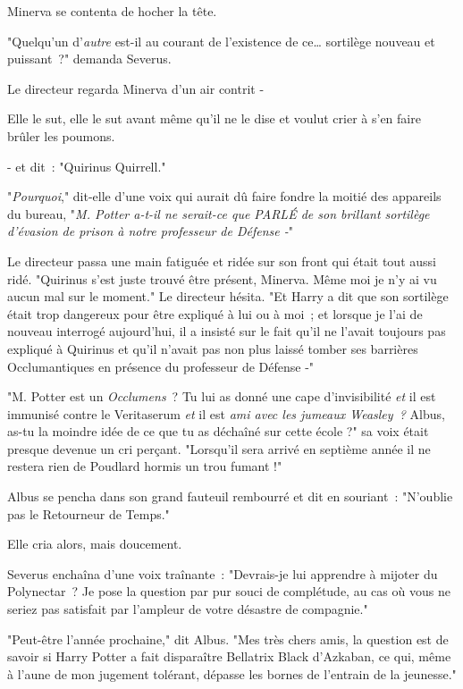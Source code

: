 Minerva se contenta de hocher la tête.

"Quelqu'un d'\emph{autre} est-il au courant de l'existence de ce… sortilège nouveau et puissant~?" demanda Severus.

Le directeur regarda Minerva d'un air contrit -

Elle le sut, elle le sut avant même qu'il ne le dise et voulut crier à s'en faire brûler les poumons.

- et dit~: "Quirinus Quirrell."

"\emph{Pourquoi}," dit-elle d'une voix qui aurait dû faire fondre la moitié des appareils du bureau, "\emph{M. Potter a-t-il ne serait-ce que PARLÉ de son brillant sortilège d'évasion de prison à notre professeur de Défense -}"

Le directeur passa une main fatiguée et ridée sur son front qui était tout aussi ridé. "Quirinus s'est juste trouvé être présent, Minerva. Même moi je n'y ai vu aucun mal sur le moment." Le directeur hésita. "Et Harry a dit que son sortilège était trop dangereux pour être expliqué à lui ou à moi~; et lorsque je l'ai de nouveau interrogé aujourd'hui, il a insisté sur le fait qu'il ne l'avait toujours pas expliqué à Quirinus et qu'il n'avait pas non plus laissé tomber ses barrières Occlumantiques en présence du professeur de Défense -"

"M. Potter est un \emph{Occlumens}~? Tu lui as donné une cape d'invisibilité \emph{et} il est immunisé contre le Veritaserum \emph{et} il est \emph{ami avec les jumeaux Weasley~?} Albus, as-tu la moindre idée de ce que tu as déchaîné sur cette école ?" sa voix était presque devenue un cri perçant. "Lorsqu'il sera arrivé en septième année il ne restera rien de Poudlard hormis un trou fumant !"

Albus se pencha dans son grand fauteuil rembourré et dit en souriant~: "N'oublie pas le Retourneur de Temps."

Elle cria alors, mais doucement.

Severus enchaîna d'une voix traînante~: "Devrais-je lui apprendre à mijoter du Polynectar~? Je pose la question par pur souci de complétude, au cas où vous ne seriez pas satisfait par l'ampleur de votre désastre de compagnie."

"Peut-être l'année prochaine," dit Albus. "Mes très chers amis, la question est de savoir si Harry Potter a fait disparaître Bellatrix Black d'Azkaban, ce qui, même à l'aune de mon jugement tolérant, dépasse les bornes de l'entrain de la jeunesse."

